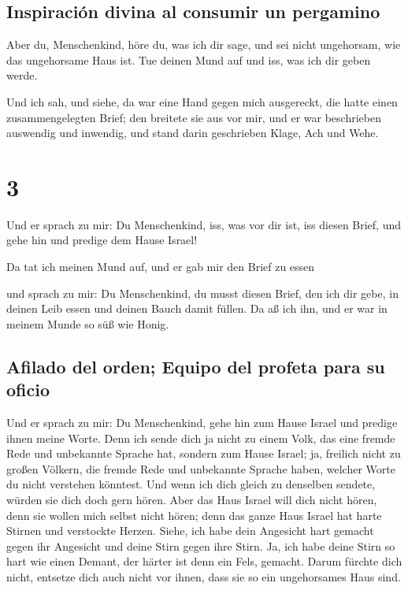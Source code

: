 \hypertarget{inspiraciuxf3n-divina-al-consumir-un-pergamino}{%
\subsection{Inspiración divina al consumir un
pergamino}\label{inspiraciuxf3n-divina-al-consumir-un-pergamino}}

 Aber du, Menschenkind, höre du, was ich dir sage, und sei
nicht ungehorsam, wie das ungehorsame Haus ist. Tue deinen Mund auf und
iss, was ich dir geben werde.

 Und ich sah, und siehe, da war eine Hand gegen mich
ausgereckt, die hatte einen zusammengelegten Brief;  den
breitete sie aus vor mir, und er war beschrieben auswendig und inwendig,
und stand darin geschrieben Klage, Ach und Wehe.

\hypertarget{section-2}{%
\section{3}\label{section-2}}

 Und er sprach zu mir: Du Menschenkind, iss, was vor dir
ist, iss diesen Brief, und gehe hin und predige dem Hause Israel!

 Da tat ich meinen Mund auf, und er gab mir den Brief zu
essen

 und sprach zu mir: Du Menschenkind, du musst diesen
Brief, den ich dir gebe, in deinen Leib essen und deinen Bauch damit
füllen. Da aß ich ihn, und er war in meinem Munde so süß wie Honig.

\hypertarget{afilado-del-orden-equipo-del-profeta-para-su-oficio}{%
\subsection{Afilado del orden; Equipo del profeta para su
oficio}\label{afilado-del-orden-equipo-del-profeta-para-su-oficio}}

 Und er sprach zu mir: Du Menschenkind, gehe hin zum Hause
Israel und predige ihnen meine Worte.  Denn ich sende dich
ja nicht zu einem Volk, das eine fremde Rede und unbekannte Sprache hat,
sondern zum Hause Israel;  ja, freilich nicht zu großen
Völkern, die fremde Rede und unbekannte Sprache haben, welcher Worte du
nicht verstehen könntest. Und wenn ich dich gleich zu denselben sendete,
würden sie dich doch gern hören.  Aber das Haus Israel
will dich nicht hören, denn sie wollen mich selbst nicht hören; denn das
ganze Haus Israel hat harte Stirnen und verstockte Herzen.
 Siehe, ich habe dein Angesicht hart gemacht gegen ihr
Angesicht und deine Stirn gegen ihre Stirn.  Ja, ich habe
deine Stirn so hart wie einen Demant, der härter ist denn ein Fels,
gemacht. Darum fürchte dich nicht, entsetze dich auch nicht vor ihnen,
dass sie so ein ungehorsames Haus sind.

